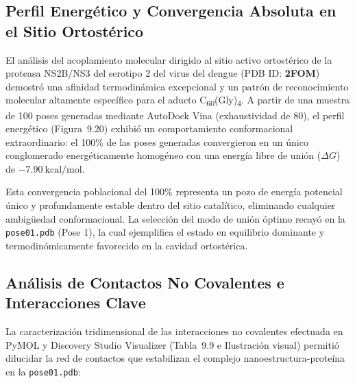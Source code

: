 \subsection{Perfil Energético y Convergencia Absoluta en el Sitio Ortostérico}

El análisis del acoplamiento molecular dirigido al sitio activo ortostérico de la proteasa NS2B/NS3 del serotipo 2 del virus del dengue (PDB ID: \textbf{2FOM}) demostró una afinidad termodinámica excepcional y un patrón de reconocimiento molecular altamente específico para el aducto C\textsubscript{60}(Gly)\textsubscript{4}. A partir de una muestra de 100 poses generadas mediante AutoDock Vina (exhaustividad de 80), el perfil energético (Figura~9.20) exhibió un comportamiento conformacional extraordinario: el 100\% de las poses generadas convergieron en un único conglomerado energéticamente homogéneo con una energía libre de unión ($\Delta G$) de $-7.90\ \text{kcal/mol}$.

Esta convergencia poblacional del 100\% representa un pozo de energía potencial único y profundamente estable dentro del sitio catalítico, eliminando cualquier ambigüedad conformacional. La selección del modo de unión óptimo recayó en la \texttt{pose01.pdb} (Pose 1), la cual ejemplifica el estado en equilibrio dominante y termodinómicamente favorecido en la cavidad ortostérica.

\subsection{Análisis de Contactos No Covalentes e Interacciones Clave}

La caracterización tridimensional de las interacciones no covalentes efectuada en PyMOL y Discovery Studio Visualizer (Tabla~9.9 e Ilustración visual) permitió dilucidar la red de contactos que estabilizan el complejo nanoestructura-proteína en la \texttt{pose01.pdb}:

